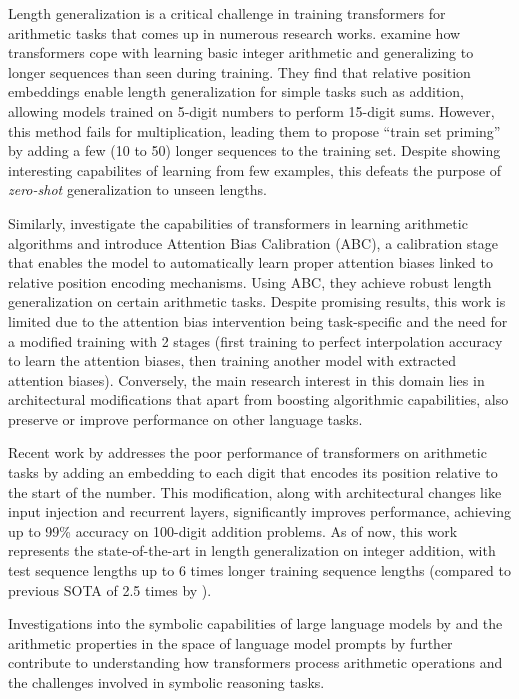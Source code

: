 Length generalization is a critical challenge in training transformers for arithmetic tasks that comes up in numerous research works. \cite{jelassi_length_2023} examine how transformers cope with learning basic integer arithmetic and generalizing to longer sequences than seen during training. They find that relative position embeddings enable length generalization for simple tasks such as addition, allowing models trained on 5-digit numbers to perform 15-digit sums. However, this method fails for multiplication, leading them to propose ``train set priming'' by adding a few (10 to 50) longer sequences to the training set. Despite showing interesting capabilites of learning from few examples, this defeats the purpose of \emph{zero-shot} generalization to unseen lengths.

Similarly, \cite{duan_interpolation_2023} investigate the capabilities of transformers in learning arithmetic algorithms and introduce Attention Bias Calibration (ABC), a calibration stage that enables the model to automatically learn proper attention biases linked to relative position encoding mechanisms. Using ABC, they achieve robust length generalization on certain arithmetic tasks. Despite promising results, this work is limited due to the attention bias intervention being task-specific and the need for a modified training with 2 stages (first training to perfect interpolation accuracy to learn the attention biases, then training another model with extracted attention biases). Conversely, the main research interest  in this domain lies in architectural modifications that apart from boosting algorithmic capabilities, also preserve or improve performance on other language tasks.

Recent work by \cite{mcleish_transformers_2024} addresses the poor performance of transformers on arithmetic tasks by adding an embedding to each digit that encodes its position relative to the start of the number. This modification, along with architectural changes like input injection and recurrent layers, significantly improves performance, achieving up to 99\% accuracy on 100-digit addition problems. As of now, this work represents the state-of-the-art in length generalization on integer addition, with test sequence lengths up to 6 times longer training sequence lengths (compared to previous SOTA of 2.5 times by \cite{zhou_transformers_2024}).

Investigations into the symbolic capabilities of large language models by \cite{dave_investigating_2024} and the arithmetic properties in the space of language model prompts by \cite{krubinski_basic_2023} further contribute to understanding how transformers process arithmetic operations and the challenges involved in symbolic reasoning tasks. 

